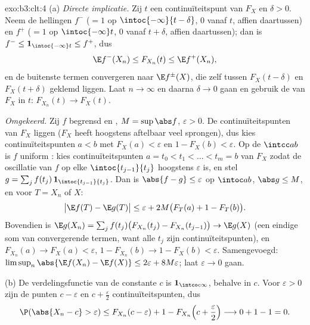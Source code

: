 \begin{solution}{exo:b3:clt:4}
(a) \emph{Directe implicatie.} Zij $t$ een
continuïteitspunt van $F_X$ en $\delta > 0$. Neem de
 hellingen $f^-$ ($= 1$ op
$\intoc{-\infty}{t-\delta}$, $0$ vanaf $t$, affien
daartussen) en $f^+$ ($= 1$ op $\intoc{-\infty}t$, $0$
vanaf $t + \delta$, affien daartussen); dan is $f^- \leq
\mathbf 1_{\intoc{-\infty}t} \leq f^+$, dus
\[
\E f^-(X_n) \leq F_{X_n}(t) \leq \E f^+(X_n),
\]
en de buitenste termen convergeren naar $\E f^\pm(X)$, die
zelf tussen $F_X(t - \delta)$ en $F_X(t + \delta)$ geklemd
liggen. Laat $n \to \infty$ en daarna $\delta \to 0$ gaan
en gebruik de  van $F_X$ in $t$: $F_{X_n}(t)
\to F_X(t)$.

\emph{Omgekeerd.} Zij $f$ begrensd en , $M =
\sup\abs f$, $\varepsilon > 0$. De continuïteitspunten van
$F_X$ liggen  ($F_X$ heeft hoogstens aftelbaar veel
sprongen), dus kies continuïteitspunten $a < b$ met $F_X(a)
< \varepsilon$ en $1 - F_X(b) < \varepsilon$. Op de
 $\intcc ab$ is $f$ uniform : kies
continuïteitspunten $a = t_0 < t_1 < \dots < t_m = b$ van
$F_X$ zodat de oscillatie van $f$ op elke
$\intoc{t_{j-1}}{t_j}$ hoogstens $\varepsilon$ is, en stel
$g = \sum_j f(t_j)\,\mathbf 1_{\intoc{t_{j-1}}{t_j}}$. Dan
is $\abs{f - g} \leq \varepsilon$ op $\intoc ab$, $\abs g
\leq M$, en voor $T = X_n$ of $X$:
\[
\bigl|\E f(T) - \E g(T)\bigr| \leq \varepsilon +
2M\bigl(F_T(a) + 1 - F_T(b)\bigr).
\]
Bovendien is $\E g(X_n) = \sum_j f(t_j)\bigl(F_{X_n}(t_j) -
F_{X_n}(t_{j-1})\bigr) \to \E g(X)$ (een eindige som van
convergerende termen, want alle $t_j$ zijn
continuïteitspunten), en $F_{X_n}(a) \to F_X(a) <
\varepsilon$, $1 - F_{X_n}(b) \to 1 - F_X(b) <
\varepsilon$. Samengevoegd: $\limsup_n\abs{\E f(X_n) - \E
f(X)} \leq 2\varepsilon + 8M\varepsilon$; laat $\varepsilon
\to 0$ gaan.

(b) De verdelingsfunctie van de constante $c$ is $\mathbf
1_{\intco c\infty}$,  behalve in $c$. Voor
$\varepsilon > 0$ zijn de punten $c - \varepsilon$ en $c +
\frac\varepsilon2$ continuïteitspunten, dus
\[
\P(\abs{X_n - c} > \varepsilon) \leq F_{X_n}(c -
\varepsilon) + 1 - F_{X_n}\Bigl(c + \frac\varepsilon2\Bigr)
\longrightarrow 0 + 1 - 1 = 0 .
\]
\end{solution}

